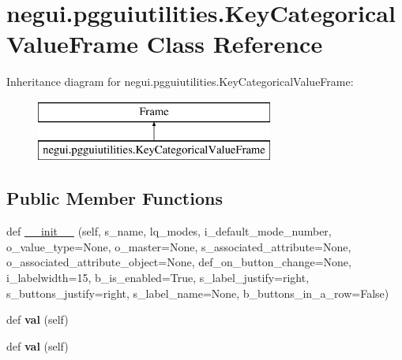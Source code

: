 \hypertarget{classnegui_1_1pgguiutilities_1_1KeyCategoricalValueFrame}{}\section{negui.\+pgguiutilities.\+Key\+Categorical\+Value\+Frame Class Reference}
\label{classnegui_1_1pgguiutilities_1_1KeyCategoricalValueFrame}
Inheritance diagram for negui.\+pgguiutilities.\+Key\+Categorical\+Value\+Frame\+:\begin{figure}[H]
\begin{center}
\leavevmode
\includegraphics[height=2.000000cm]{classnegui_1_1pgguiutilities_1_1KeyCategoricalValueFrame}
\end{center}
\end{figure}
\subsection*{Public Member Functions}
\begin{DoxyCompactItemize}
\item 
def \hyperlink{classnegui_1_1pgguiutilities_1_1KeyCategoricalValueFrame_a11a7df8463674dbf3a0d65281af0aad9}{\+\_\+\+\_\+init\+\_\+\+\_\+} (self, s\+\_\+name, lq\+\_\+modes, i\+\_\+default\+\_\+mode\+\_\+number, o\+\_\+value\+\_\+type=None, o\+\_\+master=None, s\+\_\+associated\+\_\+attribute=None, o\+\_\+associated\+\_\+attribute\+\_\+object=None, def\+\_\+on\+\_\+button\+\_\+change=None, i\+\_\+labelwidth=15, b\+\_\+is\+\_\+enabled=True, s\+\_\+label\+\_\+justify=\textquotesingle{}right\textquotesingle{}, s\+\_\+buttons\+\_\+justify=\textquotesingle{}right\textquotesingle{}, s\+\_\+label\+\_\+name=None, b\+\_\+buttons\+\_\+in\+\_\+a\+\_\+row=False)
\item 
def {\bfseries val} (self)\hypertarget{classnegui_1_1pgguiutilities_1_1KeyCategoricalValueFrame_a5d86db393ee3cf1e974f063a75b64b22}{}\label{classnegui_1_1pgguiutilities_1_1KeyCategoricalValueFrame_a5d86db393ee3cf1e974f063a75b64b22}

\item 
def {\bfseries val} (self)\hypertarget{classnegui_1_1pgguiutilities_1_1KeyCategoricalValueFrame_a5d86db393ee3cf1e974f063a75b64b22}{}\label{classnegui_1_1pgguiutilities_1_1KeyCategoricalValueFrame_a5d86db393ee3cf1e974f063a75b64b22}

\end{DoxyCompactItemize}


